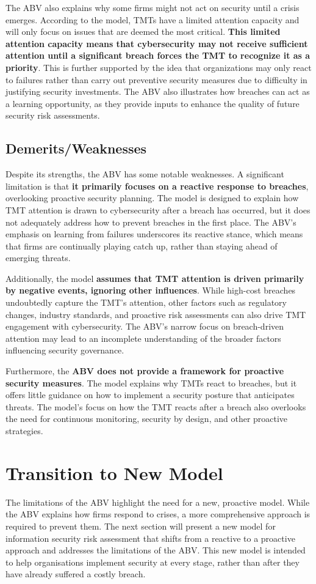 The ABV also explains why some firms might not act on security until a crisis emerges. According to the model, TMTs have a limited attention capacity and will only focus on issues that are deemed the most critical. \textbf{This limited attention capacity means that cybersecurity may not receive sufficient attention until a significant breach forces the TMT to recognize it as a priority}. This is further supported by the idea that organizations may only react to failures rather than carry out preventive security measures due to difficulty in justifying security investments. The ABV also illustrates how breaches can act as a learning opportunity, as they provide inputs to enhance the quality of future security risk assessments.

\subsection{Demerits/Weaknesses}
Despite its strengths, the ABV has some notable weaknesses. A significant limitation is that \textbf{it primarily focuses on a reactive response to breaches}, overlooking proactive security planning. The model is designed to explain how TMT attention is drawn to cybersecurity after a breach has occurred, but it does not adequately address how to prevent breaches in the first place. The ABV's emphasis on learning from failures underscores its reactive stance, which means that firms are continually playing catch up, rather than staying ahead of emerging threats.

Additionally, the model \textbf{assumes that TMT attention is driven primarily by negative events, ignoring other influences}. While high-cost breaches undoubtedly capture the TMT's attention, other factors such as regulatory changes, industry standards, and proactive risk assessments can also drive TMT engagement with cybersecurity. The ABV’s narrow focus on breach-driven attention may lead to an incomplete understanding of the broader factors influencing security governance.

Furthermore, the \textbf{ABV does not provide a framework for proactive security measures}. The model explains why TMTs react to breaches, but it offers little guidance on how to implement a security posture that anticipates threats. The model's focus on how the TMT reacts after a breach also overlooks the need for continuous monitoring, security by design, and other proactive strategies.

\section{Transition to New Model}
The limitations of the ABV highlight the need for a new, proactive model. While the ABV explains how firms respond to crises, a more comprehensive approach is required to prevent them. The next section will present a new model for information security risk assessment that shifts from a reactive to a proactive approach and addresses the limitations of the ABV. This new model is intended to help organisations implement security at every stage, rather than after they have already suffered a costly breach.